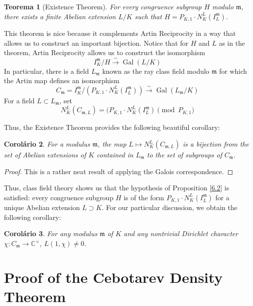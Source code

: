 \documentclass{article}
\DeclareMathOperator{\Gal}{Gal}
\newcommand{\CC}{\mathbb{C}}
\theoremstyle{plain}
\newtheorem{thm}{Teorema}
\newtheorem{cor}[thm]{Corolário}
\theoremstyle{definition}
\theoremstyle{remark}
\numberwithin{equation}{section}
\numberwithin{thm}{section}
\begin{document}
\begin{thm}[Existence Theorem]
For every congruence subgroup $H$ modulo $\mathfrak{m}$, there exists a finite Abelian extension $L/K$ such that $H = P_{K, 1} \cdot N_{K}^{L}(I_{L}^{\mathfrak{m}})$.
\end{thm}

This theorem is nice because it complements Artin Reciprocity in a way that allows us to construct an important bijection. Notice that for $H$ and $L$ as in the theorem, Artin Reciprocity allows us to construct the isomorphism $$I_{K}^{\mathfrak{m}}/H \xrightarrow{\sim} \Gal(L/K)$$ In particular, there is a field $L_{\mathfrak{m}}$ known as the ray class field modulo $\mathfrak{m}$ for which the Artin map defines an isomorphism $$C_{\mathfrak{m}} = I_{K}^{\mathfrak{m}}/(P_{K,1}\cdot N_{K}^{L}(I_{L}^{\mathfrak{m}})) \xrightarrow{\sim} \Gal(L_{\mathfrak{m}}/K)$$ For a field $L \subset L_{\mathfrak{m}}$, set $$N_{K}^{L}(C_{\mathfrak{m}, L}) = (P_{K,1}\cdot N_{K}^{L}(I_{L}^{\mathfrak{m}}) \pmod{P_{K, 1}}$$

Thus, the Existence Theorem provides the following beautiful corollary:

\begin{cor}
For a modulus $\mathfrak{m}$, the map $L \mapsto N_{K}^{L}(C_{\mathfrak{m}, L})$ is a bijection from the set of Abelian extensions of $K$ contained in $L_{\mathfrak{m}}$ to the set of subgroups of $C_{\mathfrak{m}}$.
\end{cor}

\begin{proof}
This is a rather neat result of applying the Galois correspondence. 
\end{proof}

Thus, class field theory shows us that the hypothesis of Proposition \ref{6.2} is satisfied: every congruence subgroup $H$ is of the form $P_{K, 1} \cdot N_{K}^{L}(I_{L}^{\mathfrak{m}})$ for a unique Abelian extension $L \supset K$. For our particular discussion, we obtain the following corollary:

\begin{cor} \label{6.7}
For any modulus $\mathfrak{m}$ of $K$ and any nontrivial Dirichlet character $\chi : C_{\mathfrak{m}} \longrightarrow \CC^{\times}$, $L(1, \chi) \neq 0$.
\end{cor}

\section{Proof of the Cebotarev Density Theorem}
\end{document}
